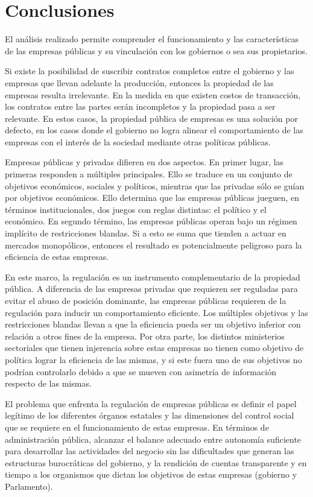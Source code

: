 \documentclass[
  12pt,
  spanish,
]{book}
\begin{document}
\hypertarget{conclusiones-2}{%
\section{Conclusiones}\label{conclusiones-2}}

El análisis realizado permite comprender el funcionamiento y las
características de las empresas públicas y su vinculación con los
gobiernos o sea sus propietarios.

Si existe la posibilidad de suscribir contratos completos entre el
gobierno y las empresas que llevan adelante la producción, entonces la
propiedad de las empresas resulta irrelevante. En la medida en que
existen costos de transacción, los contratos entre las partes serán
incompletos y la propiedad pasa a ser relevante. En estos casos, la
propiedad pública de empresas es una solución por defecto, en los casos
donde el gobierno no logra alinear el comportamiento de las empresas con
el interés de la sociedad mediante otras políticas públicas.

Empresas públicas y privadas difieren en dos aspectos. En primer lugar,
las primeras responden a múltiples principales. Ello se traduce en un
conjunto de objetivos económicos, sociales y políticos, mientras que las
privadas sólo se guían por objetivos económicos. Ello determina que las
empresas públicas jueguen, en términos institucionales, dos juegos con
reglas distintas: el político y el económico. En segundo término, las
empresas públicas operan bajo un régimen implícito de restricciones
blandas. Si a esto se suma que tienden a actuar en mercados monopólicos,
entonces el resultado es potencialmente peligroso para la eficiencia de
estas empresas.

En este marco, la regulación es un instrumento complementario de la
propiedad pública. A diferencia de las empresas privadas que requieren
ser reguladas para evitar el abuso de posición dominante, las empresas
públicas requieren de la regulación para inducir un comportamiento
eficiente. Los múltiples objetivos y las restricciones blandas llevan a
que la eficiencia pueda ser un objetivo inferior con relación a otros
fines de la empresa. Por otra parte, los distintos ministerios
sectoriales que tienen injerencia sobre estas empresas no tienen como
objetivo de política lograr la eficiencia de las mismas, y si este fuera
uno de sus objetivos no podrían controlarlo debido a que se mueven con
asimetría de información respecto de las mismas.

El problema que enfrenta la regulación de empresas públicas es definir
el papel legítimo de los diferentes órganos estatales y las dimensiones
del control social que se requiere en el funcionamiento de estas
empresas. En términos de administración pública, alcanzar el balance
adecuado entre autonomía suficiente para desarrollar las actividades del
negocio sin las dificultades que generan las estructuras burocráticas
del gobierno, y la rendición de cuentas transparente y en tiempo a los
organismos que dictan los objetivos de estas empresas (gobierno y
Parlamento).
\end{document}

